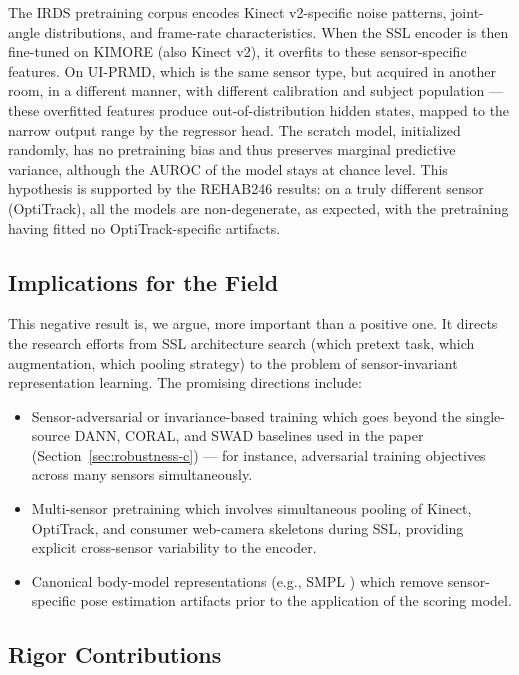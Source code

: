 \documentclass[10pt,journal]{IEEEtran}
\begin{document}
The IRDS pretraining corpus encodes Kinect v2-specific noise patterns, joint-angle distributions, and frame-rate characteristics. When the SSL encoder is then fine-tuned on KIMORE (also Kinect v2), it overfits to these sensor-specific features. On UI-PRMD, which is the same sensor type, but acquired in another room, in a different manner, with different calibration and subject population --- these overfitted features produce out-of-distribution hidden states, mapped to the narrow output range by the regressor head. The scratch model, initialized randomly, has no pretraining bias and thus preserves marginal predictive variance, although the AUROC of the model stays at chance level. This hypothesis is supported by the REHAB246 results: on a truly different sensor (OptiTrack), all the models are non-degenerate, as expected, with the pretraining having fitted no OptiTrack-specific artifacts.

\subsection{Implications for the Field}
\label{sec:implications}

This negative result is, we argue, more important than a positive one. It directs the research efforts from SSL architecture search (which pretext task, which augmentation, which pooling strategy) to the problem of sensor-invariant representation learning. The promising directions include:
\begin{itemize}
    \item Sensor-adversarial or invariance-based training which goes beyond the single-source DANN, CORAL, and SWAD baselines used in the paper (Section~\ref{sec:robustness-c}) --- for instance, adversarial training objectives across many sensors simultaneously.
    \item Multi-sensor pretraining which involves simultaneous pooling of Kinect, OptiTrack, and consumer web-camera skeletons during SSL, providing explicit cross-sensor variability to the encoder.
    \item Canonical body-model representations (e.g., SMPL \cite{loper2015smpl}) which remove sensor-specific pose estimation artifacts prior to the application of the scoring model.
\end{itemize}

\subsection{Rigor Contributions}
\label{sec:rigor}
\end{document}
